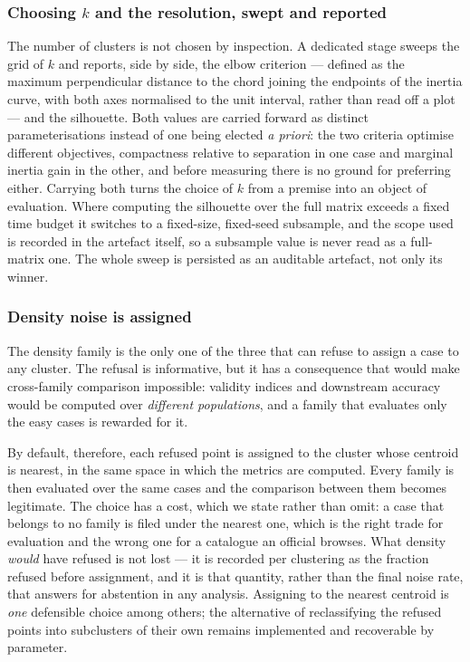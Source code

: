 \subsubsection{Choosing \texorpdfstring{$k$}{k} and the resolution, swept and reported}\label{sec:selectk}

The number of clusters is not chosen by inspection. A dedicated stage sweeps the grid of $k$ and
reports, side by side, the elbow criterion --- defined as the maximum perpendicular distance to
the chord joining the endpoints of the inertia curve, with both axes normalised to the unit
interval, rather than read off a plot --- and the silhouette. Both values are carried forward as
distinct parameterisations instead of one being elected \emph{a priori}: the two criteria
optimise different objectives, compactness relative to separation in one case and marginal
inertia gain in the other, and before measuring there is no ground for preferring either. Carrying
both turns the choice of $k$ from a premise into an object of evaluation. Where computing the
silhouette over the full matrix exceeds a fixed time budget it switches to a fixed-size,
fixed-seed subsample, and the scope used is recorded in the artefact itself, so a subsample value
is never read as a full-matrix one. The whole sweep is persisted as an auditable artefact, not
only its winner.

\subsubsection{Density noise is assigned}\label{sec:noise}

The density family is the only one of the three that can refuse to assign a case to any cluster.
The refusal is informative, but it has a consequence that would make cross-family comparison
impossible: validity indices and downstream accuracy would be computed over \emph{different
populations}, and a family that evaluates only the easy cases is rewarded for it.

By default, therefore, each refused point is assigned to the cluster whose centroid is nearest,
in the same space in which the metrics are computed. Every family is then evaluated over the same
cases and the comparison between them becomes legitimate. The choice has a cost, which we state
rather than omit: a case that belongs to no family is filed under the nearest one, which is the
right trade for evaluation and the wrong one for a catalogue an official browses. What density
\emph{would} have refused is not lost --- it is recorded per clustering as the fraction refused
before assignment, and it is that quantity, rather than the final noise rate, that answers for
abstention in any analysis. Assigning to the nearest centroid is \emph{one} defensible choice
among others; the alternative of reclassifying the refused points into subclusters of their own
remains implemented and recoverable by parameter.

